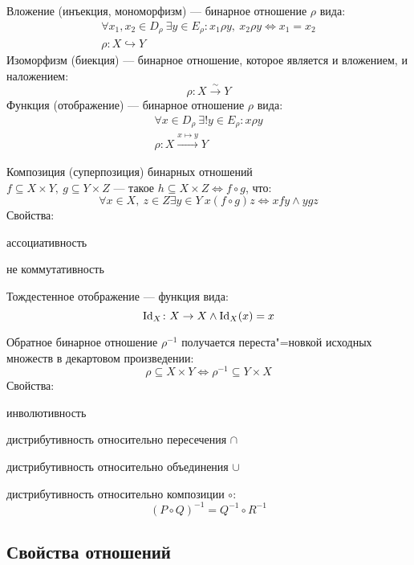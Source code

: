 {\bold Вложение} {\ital (инъекция, мономорфизм)} --- бинарное отношение $\rho$ вида:
$$\begin{gathered}
\forall x_1,x_2\in D_\rho\ \exists y\in E_\rho\colon x_1\rho y,\ x_2\rho y\iff x_1=x_2\\
\rho\colon X\hookrightarrow Y
\end{gathered}$$
{\bold Изоморфизм} {\ital (биекция)} --- бинарное отношение, которое является {\ital и вложением, и наложением}:
$$\rho\colon X\xrightarrow{\sim}Y$$
{\bold Функция} {\ital (отображение)} --- бинарное отношение $\rho$ вида:
$$\begin{gathered}
\forall x\in D_\rho\ \exists!y\in E_\rho\colon x\rho y\\
\rho\colon X\xrightarrow{x\mapsto y} Y
\end{gathered}$$
\begin{theorem}
{\bold Композиция} {\ital (суперпозиция)} бинарных отношений\\ $f\subseteq X\times Y,\ g\subseteq Y\times Z$ --- такое $h\subseteq X\times Z\iff f\circ g$, что:
$$\forall x\in X,\ z\in Z\exists y\in Y\ x(f\circ g)z\iff xfy\land ygz$$
Свойства:

\begin{list*}
\item ассоциативность
\item {\ital *не коммутативность}
\end{list*}
\end{theorem}

{\bold Тождестенное отображение} --- функция вида:
$$\mathrm{Id}_X\colon X\to X\land\mathrm{Id}_X(x)=x$$
\begin{theorem}
{\bold Обратное} бинарное отношение $\rho^{-1}$ получается переста"=новкой исходных множеств в декартовом произведении:
$$\rho\subseteq X\times Y\iff\rho^{-1}\subseteq Y\times X$$
Свойства:
\begin{list*}
\item инволютивность
\item дистрибутивность относительно {\ital пересечения} $\cap$
\item дистрибутивность относительно {\ital объединения} $\cup$
\item дистрибутивность относительно {\ital композиции} $\circ$:
$$(P\circ Q)^{-1}=Q^{-1}\circ R^{-1}$$
\end{list*}
\end{theorem}

\subsection{Свойства отношений}

